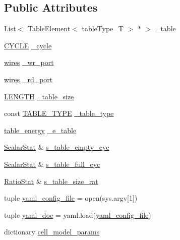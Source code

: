 \subsection*{Public Attributes}
\begin{DoxyCompactItemize}
\item 
\hyperlink{classList}{List}$<$ \hyperlink{structTableElement}{TableElement}$<$ tableType\_\-T $>$ $\ast$ $>$ \hyperlink{classtable_aea78e74d4f44c1879df0c44e69d7bc26}{\_\-table}
\item 
\hyperlink{global_2global_8h_a7e19a550ec11d1ed921deb20c22efb5b}{CYCLE} \hyperlink{classtable_a64d740f2c6bbb938aac4a89bcbd76674}{\_\-cycle}
\item 
\hyperlink{classwires}{wires} \hyperlink{classtable_a7c068dc525606b03270d704ea3494f91}{\_\-wr\_\-port}
\item 
\hyperlink{classwires}{wires} \hyperlink{classtable_a55194c16991775949c0bc2e2ce0dd1de}{\_\-rd\_\-port}
\item 
\hyperlink{binaryTranslator_2global_8h_a9f35cc405c37836572563f16d0302ba6}{LENGTH} \hyperlink{classtable_a7bb72e9a56072266491b5a125b41ef87}{\_\-table\_\-size}
\item 
const \hyperlink{table_8h_ae42c42cf2da8a8d43c157d91ad4f3158}{TABLE\_\-TYPE} \hyperlink{classtable_ae804042049b8e94591efe22ae05c0371}{\_\-table\_\-type}
\item 
\hyperlink{classtable__energy}{table\_\-energy} \hyperlink{classtable_ad581f47c3a5858efcc8ea5377fe6c77a}{\_\-e\_\-table}
\item 
\hyperlink{classScalarStat}{ScalarStat} \& \hyperlink{classtable_a55b2044ce2664c572a3ad3bd658dcbfe}{s\_\-table\_\-empty\_\-cyc}
\item 
\hyperlink{classScalarStat}{ScalarStat} \& \hyperlink{classtable_ab2e2f8d83bb377b91a283abcb90a36a7}{s\_\-table\_\-full\_\-cyc}
\item 
\hyperlink{classRatioStat}{RatioStat} \& \hyperlink{classtable_a9535b93bb57e405b922fb45afdb75ad0}{s\_\-table\_\-size\_\-rat}
\item 
tuple \hyperlink{classtable_af711f0fa04be7ff6e233884b184cb339}{yaml\_\-config\_\-file} = open(sys.argv\mbox{[}1\mbox{]})
\item 
tuple \hyperlink{classtable_a068029d2d6ede2fab66a603c83626ed1}{yaml\_\-doc} = yaml.load(\hyperlink{classtable_af711f0fa04be7ff6e233884b184cb339}{yaml\_\-config\_\-file})
\item 
dictionary \hyperlink{classtable_affb2ec85d44634a9b5e4791b756489ca}{cell\_\-model\_\-params}
\item 

\end{DoxyCompactItemize}
